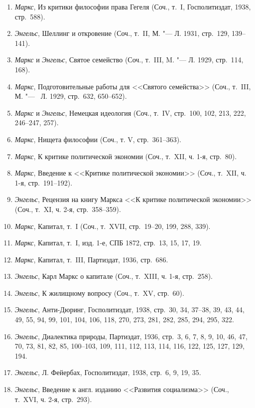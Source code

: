 {{\begin{enumerate}
\item {\em Маркс}, Из критики философии права Гегеля (Соч., т.~I, Госполитиздат,
1938, стр.~588).
\item {\em Энгельс}, Шеллинг и откровение (Соч., т.~II, М. "--- Л. 1931, стр.~129,
139--141).
\item {\em Маркс} и {\em Энгельс}, Святое семейство (Соч., т.~III, M. "--- Л. 1929,
стр.~114, 168).
\item {\em Маркс}, Подготовительные работы для <<Святого семейства>> (Соч.,
т.~III, М. "--- \ Л. 1929, стр.~632, 650--652).
\item {\em Маркс} и {\em Энгельс},
Немецкая идеология (Соч., т.~IV, стр.~100, 102, 213, 222,
246--247, 257).
\item {\em Маркс}, Нищета философии (Соч., т. V, стр.~361--363).
\item {\em Маркс}, К критике политической экономии (Соч., т.~XII, ч. 1-я,
стр.~80).
\item {\em Маркс}, Введение к <<Критике политической экономии>> (Соч., т.~XII, ч.
1-я, стр.~191--192).
\item {\em Энгельс}, Рецензия на книгу Маркса <<К критике политической экономии>>
(Соч., т.~XI, ч. 2-я, стр.~358--359).
\item {\em Маркс}, Капитал, т.~I (Соч., т.~XVII, стр.~19--20, 199, 288, 339).
\item {\em Маркс}, Капитал, т.~I, изд. 1-е, СПБ 1872, стр.~13, 15, 17, 19.
\item {\em Маркс}, Капитал, т.~III, Партиздат, 1936, стр.~686.
\item {\em Энгельс}, Карл Маркс о капитале (Соч., т.~XIII, ч. 1-я, стр.~258).
\item {\em Энгельс}, К жилищному вопросу (Соч., т.~XV, стр.~60).
\item {\em Энгельс}, Анти-Дюринг, Госполитиздат, 1938, стр.~30, 34, 37--38, 39, 43,
44, 49, 55, 94, 99, 101, 104, 106, 118, 270, 273, 281, 282, 285, 294, 295,
322.
\item {\em Энгельс}, Диалектика природы, Партиздат, 1936, стр.~3, 6, 7, 8, 9, 10,
46, 47, 70, 73, 81, 82, 85, 100--103, 109, 111, 112, 113, 114, 116, 122,
125, 127, 129, 194.
\item {\em Энгельс}, Л. Фейербах, Госполитиздат, 1938, стр.~6, 9, 19, 35.
\item {\em Энгельс}, Введение к англ. изданию <<Развития социализма>> (Соч., т.~XVI,
ч. 2-я, стр.~293).
\end{enumerate}

}}

